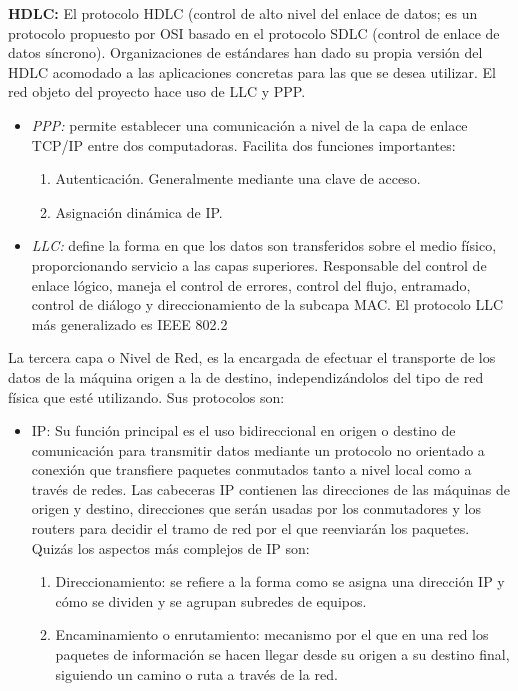 \documentclass[a4paper,10pt]{article}
\begin{document}
\textbf{HDLC:} El protocolo HDLC (control de alto nivel del enlace de datos; es un protocolo propuesto por OSI basado en el protocolo SDLC (control de enlace de datos síncrono). 
Organizaciones de estándares han dado su propia versión del HDLC acomodado a las aplicaciones concretas para las que se desea utilizar.
El red objeto del proyecto hace uso de LLC y PPP.
\begin{itemize}
	\item \textit{PPP:} permite establecer una comunicación a nivel de la capa de enlace    TCP/IP entre dos computadoras. Facilita dos funciones importantes:
	\begin{enumerate}
		\item Autenticación. Generalmente mediante una clave de acceso.
		\item Asignación dinámica de IP.
	\end{enumerate}
	\item \textit{LLC:} define la forma en que los datos son transferidos sobre el medio físico, proporcionando servicio a las capas superiores. 
	Responsable del control de enlace lógico, maneja el control de errores, control del flujo, entramado, control de diálogo y direccionamiento de la subcapa MAC. El protocolo LLC más generalizado es IEEE 802.2
\end{itemize}
La tercera capa o Nivel de Red, es la encargada de efectuar el transporte de los datos de la máquina origen a la de destino, independizándolos del tipo de red física que esté utilizando. Sus protocolos son:
\begin{itemize}
	\item IP:  Su función principal es el uso bidireccional en origen o destino de comunicación para transmitir datos mediante un protocolo no orientado a conexión que transfiere paquetes conmutados tanto a nivel local como a través de redes. 
	Las cabeceras IP contienen las direcciones de las máquinas de origen y destino, direcciones que serán usadas por los conmutadores y los routers para decidir el tramo de red por el que reenviarán los paquetes. Quizás los aspectos más complejos de IP son:
	\begin{enumerate}
	\item Direccionamiento: se refiere a la forma como se asigna una dirección IP y cómo se dividen y se agrupan subredes de equipos.
	\item Encaminamiento o enrutamiento: mecanismo por el que en una red los paquetes de información se hacen llegar desde su origen a su destino final, siguiendo un camino o ruta a través de la red.
	\end{enumerate}
\end{itemize}
\end{document}
